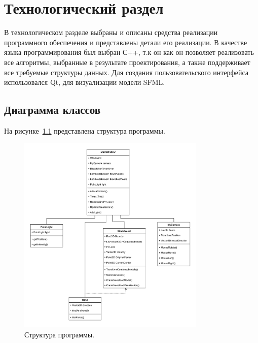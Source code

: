\chapter{Технологический раздел}

В технологическом разделе выбраны и описаны средства реализации программного обеспечения и представлены детали его реализации.
В качестве языка программирования был выбран С++, т.к он 
как он позволяет реализовать все алгоритмы, выбранные в результате проектирования, а также поддерживает все требуемые структуры данных. Для создания пользовательского интерфейса использовался Qt, для визуализации модели SFML.
\section{Диаграмма классов} 
На рисунке~\ref{fig:prog_struct} представлена структура программы.
\begin{figure}[H]
	\centering
	\includegraphics[width=0.8\textwidth, page=1]{assets/img/uml.pdf}   
	\caption{Структура программы.}
	\label{fig:prog_struct}
\end{figure}

